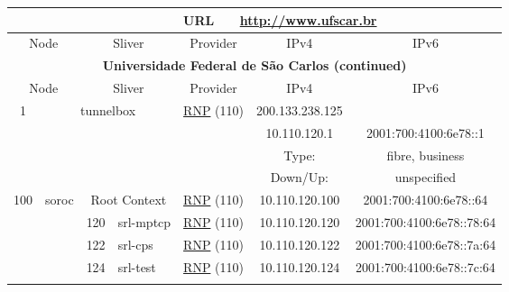 \begin{small}
\begin{center}
\begin{longtable}{|c|c|c|c|c|c|c|c|}
 \multicolumn{4}{|c|}{} & \multicolumn{1}{|l|}{URL} & \multicolumn{3}{|l|}{\url{http://www.ufscar.br}} \\ \hline
 \multicolumn{2}{|p{8em}|}{Node} & \multicolumn{2}{|p{8em}|}{Sliver} & \multicolumn{2}{|p{8em}|}{Provider} & IPv4 & IPv6 \\ \hline
\endfirsthead
\hline
 \multicolumn{8}{|c|}{\textbf{Universidade Federal de São Carlos (continued)}} \\ \hline
 \multicolumn{2}{|p{8em}|}{Node} & \multicolumn{2}{|p{8em}|}{Sliver} & \multicolumn{2}{|p{8em}|}{Provider} & IPv4 & IPv6 \\ \hline
\endhead
 \multirow{4}{*}{\tiny{1}} & \multicolumn{3}{|c|}{\multirow{4}{*}{\tiny{tunnelbox}}} & \multicolumn{2}{|c|}{\multirow{4}{*}{\tiny{\href{https://www.rnp.br}{RNP} (110)}}} & \tiny{200.133.238.125} & \frownie{} \\* \cline{7-7}\cline{8-8}
  & \multicolumn{3}{|c|}{} & \multicolumn{2}{|c|}{} & \tiny{10.110.120.1} & \tiny{2001:700:4100:6e78::1} \\* \cline{7-7}\cline{8-8}
  & \multicolumn{3}{|c|}{} & \multicolumn{2}{|c|}{} & Type: & fibre, business \\* \cline{7-7}\cline{8-8}
  & \multicolumn{3}{|c|}{} & \multicolumn{2}{|c|}{} & Down/Up:  & unspecified \\ \hline
 \multirow{5}{*}{\tiny{100}} & \multicolumn{1}{|l|}{\multirow{5}{*}{\tiny{soroc}}} & \multicolumn{2}{|c|}{\tiny{Root Context}} & \multicolumn{2}{|c|}{\tiny{\href{https://www.rnp.br}{RNP} (110)}} & \tiny{10.110.120.100} & \tiny{2001:700:4100:6e78::64} \\* \cline{3-3}\cline{4-4}\cline{5-5}\cline{6-6}\cline{7-7}\cline{8-8}
  &  & \tiny{120} & \multicolumn{1}{|l|}{\tiny{srl-mptcp}} & \multicolumn{2}{|c|}{\tiny{\href{https://www.rnp.br}{RNP} (110)}} & \tiny{10.110.120.120} & \tiny{2001:700:4100:6e78::78:64} \\* \cline{3-3}\cline{4-4}\cline{5-5}\cline{6-6}\cline{7-7}\cline{8-8}
  &  & \tiny{122} & \multicolumn{1}{|l|}{\tiny{srl-cps}} & \multicolumn{2}{|c|}{\tiny{\href{https://www.rnp.br}{RNP} (110)}} & \tiny{10.110.120.122} & \tiny{2001:700:4100:6e78::7a:64} \\* \cline{3-3}\cline{4-4}\cline{5-5}\cline{6-6}\cline{7-7}\cline{8-8}
  &  & \tiny{124} & \multicolumn{1}{|l|}{\tiny{srl-test}} & \multicolumn{2}{|c|}{\tiny{\href{https://www.rnp.br}{RNP} (110)}} & \tiny{10.110.120.124} & \tiny{2001:700:4100:6e78::7c:64} \\* \cline{3-3}\cline{4-4}\cline{5-5}\cline{6-6}\cline{7-7}\cline{8-8}

\end{longtable}
\end{center}
\end{small}
